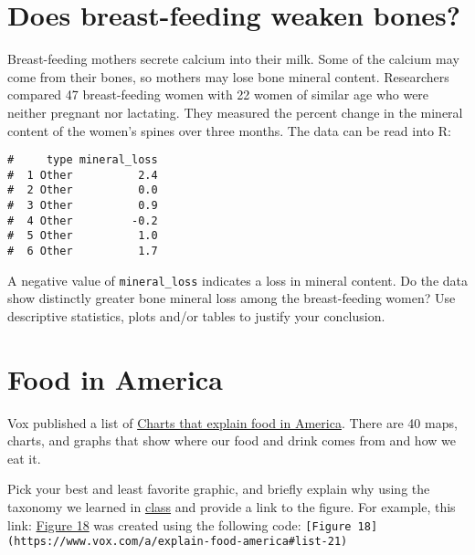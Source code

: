 \documentclass[letterpaper,9pt,twoside,printwatermark=false]{pinp}
\begin{document}
\section{Does breast-feeding weaken
bones?}\label{does-breast-feeding-weaken-bones}

Breast-feeding mothers secrete calcium into their milk. Some of the
calcium may come from their bones, so mothers may lose bone mineral
content. Researchers compared 47 breast-feeding women with 22 women of
similar age who were neither pregnant nor lactating. They measured the
percent change in the mineral content of the women's spines over three
months. The data can be read into R:

\begin{Shaded}
\begin{Highlighting}[]
\StringTok{ }\NormalTok{(}\NormalTok{)}
\end{Highlighting}
\end{Shaded}

\begin{ShadedResult}
\begin{verbatim}
#     type mineral_loss
#  1 Other          2.4
#  2 Other          0.0
#  3 Other          0.9
#  4 Other         -0.2
#  5 Other          1.0
#  6 Other          1.7
\end{verbatim}
\end{ShadedResult}

A negative value of \texttt{mineral\_loss} indicates a loss in mineral
content. Do the data show distinctly greater bone mineral loss among the
breast-feeding women? Use descriptive statistics, plots and/or tables to
justify your conclusion.

\section{Food in America}\label{food-in-america}

Vox published a list of
\href{http://www.vox.com/a/explain-food-america}{Charts that explain
food in America}. There are 40 maps, charts, and graphs that show where
our food and drink comes from and how we eat it.

Pick your best and least favorite graphic, and briefly explain why using
the taxonomy we learned in
\href{https://docs.google.com/presentation/d/1wXgcTzcRKl_leGRfNZjWWPkjwJSTlZSXBCl-fFuLEaE/edit?usp=sharing}{class}
and provide a link to the figure. For example, this link:
\href{https://www.vox.com/a/explain-food-america\#list-21}{Figure 18}
was created using the following code:
\texttt{{[}Figure\ 18{]}(https://www.vox.com/a/explain-food-america\#list-21)}





\end{document}
